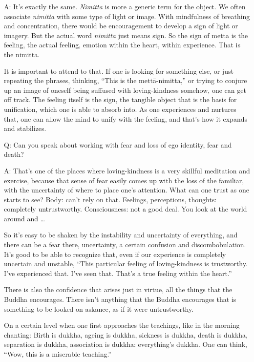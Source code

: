 \qaspace
A: It’s exactly the same. \emph{Nimitta} is more a generic term for the
object. We often associate \emph{nimitta} with some type of light or
image. With mindfulness of breathing and concentration, there would be
encouragement to develop a sign of light or imagery. But the actual word
\emph{nimitta} just means sign. So the sign of metta is the feeling, the
actual feeling, emotion within the heart, within experience. That is the
nimitta.

It is important to attend to that. If one is looking for something else,
or just repeating the phrases, thinking, “This is the mettā-nimitta,” or
trying to conjure up an image of oneself being suffused with
loving-kindness somehow, one can get off track. The feeling itself is
the sign, the tangible object that is the basis for unification, which
one is able to absorb into. As one experiences and nurtures that, one
can allow the mind to unify with the feeling, and that’s how it expands
and stabilizes.

\qaspace
Q: Can you speak about working with fear and loss of ego identity, fear
and death?

\qaspace
A: That’s one of the places where loving-kindness is a very skillful
meditation and exercise, because that sense of fear easily comes up with
the loss of the familiar, with the uncertainty of where to place one’s
attention. What can one trust as one starts to see? Body: can’t rely on
that. Feelings, perceptions, thoughts: completely untrustworthy.
Consciousness: not a good deal. You look at the world around and \ldots{}

So it’s easy to be shaken by the instability and uncertainty of
everything, and there can be a fear there, uncertainty, a certain
confusion and discombobulation. It’s good to be able to recognize that,
even if our experience is completely uncertain and unstable, “This
particular feeling of loving-kindness is trustworthy. I’ve experienced
that. I’ve seen that. That’s a true feeling within the heart.”

There is also the confidence that arises just in virtue, all the things
that the Buddha encourages. There isn’t anything that the Buddha
encourages that is something to be looked on askance, as if it were
untrustworthy.

On a certain level when one first approaches the teachings, like in the
morning chanting: Birth is dukkha, ageing is dukkha, sickness is dukkha,
death is dukkha, separation is dukkha, association is dukkha:
everything’s dukkha. One can think, “Wow, this is a miserable teaching.”

